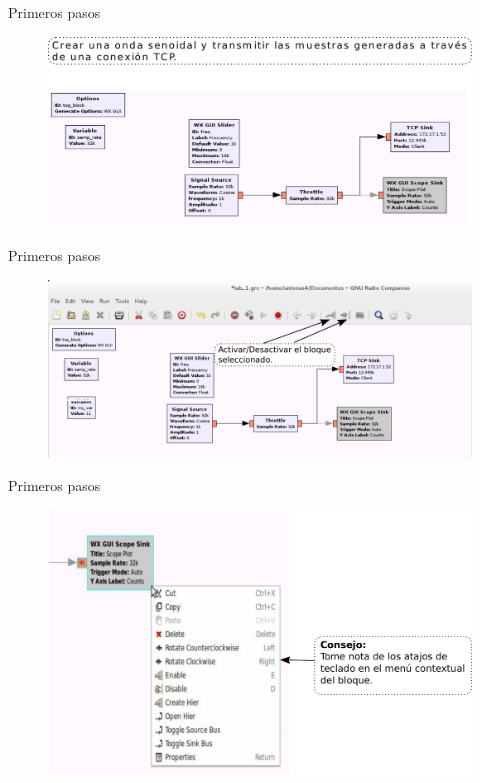 \begin{frame}{Primeros pasos}
\begin{figure}[H]
\centering
\includegraphics[width=\textwidth]{lab1/pdf/lab1_21.pdf}
\end{figure}
\end{frame}

\begin{frame}{Primeros pasos}
\begin{figure}[H]
\centering
\includegraphics[width=\textwidth]{lab1/pdf/lab1_22.pdf}
\end{figure}
\end{frame}

\begin{frame}{Primeros pasos}
\begin{figure}[H]
\centering
\includegraphics[width=\textwidth, height=0.6\textwidth]{lab1/pdf/lab1_23.pdf}
\end{figure}
\end{frame}

